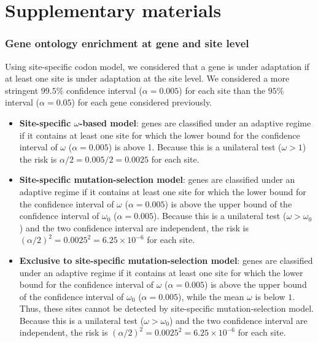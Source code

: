 \documentclass{article}
\renewcommand*{\bm}[1]{#1}%
\begin{document}
    \part*{Supplementary materials}
    \tableofcontents

    \pagebreak


    \section{Gene ontology enrichment at gene and site level}
    \label{sec:gene-ontology-enrichment}

    Using site-specific codon model, we considered that a gene is under adaptation if at least one site is under adaptation at the site level.
    We considered a more stringent $99.5$\% confidence interval ($\alpha=0.005$) for each site than the $95$\% interval ($\alpha=0.05$) for each gene considered previously.

    \begin{itemize}
        \item \textbf{Site-specific $\bm{\omega}$-based model}: genes are classified under an adaptive regime if it contains at least one site for which the lower bound for the confidence interval of $\omega$ ($\alpha=0.005$) is above 1. Because this is a unilateral test ($\omega > 1$) the risk is $\alpha/2=0.005/2=0.0025$ for each site.
        \item \textbf{Site-specific mutation-selection model}: genes are classified under an adaptive regime if it contains at least one site for which the lower bound for the confidence interval of $\omega$ ($\alpha=0.005$) is above the upper bound of the confidence interval of $\omega_{0}$ ($\alpha=0.005$). Because this is a unilateral test ($\omega > \omega_{0}$) and the two confidence interval are independent, the risk is $(\alpha/2)^2=0.0025^2=6.25 \times 10^{-6}$ for each site.
        \item \textbf{Exclusive to site-specific mutation-selection model}: genes are classified under an adaptive regime if it contains at least one site for which the lower bound for the confidence interval of $\omega$ ($\alpha=0.005$) is above the upper bound of the confidence interval of $\omega_{0}$ ($\alpha=0.005$), while the mean $\omega$ is below $1$. Thus, these sites cannot be detected by site-specific mutation-selection model. Because this is a unilateral test ($\omega > \omega_{0}$) and the two confidence interval are independent, the risk is $(\alpha/2)^2=0.0025^2=6.25 \times 10^{-6}$ for each site.
    \end{itemize}
\end{document}
